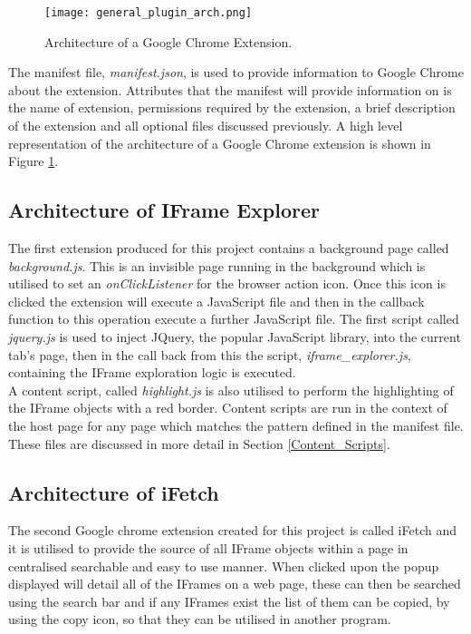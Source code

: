 \documentclass[12pt]{article}
\begin{document}
\begin{figure}[H]
    \centering
    \texttt{[image: general\_plugin\_arch.png]}
    \caption{Architecture of a Google Chrome Extension.}
    \label{fig:general_plugin_arch}
\end{figure}

The manifest file, \textit{manifest.json}, is used to provide information to Google Chrome about the extension. Attributes that the manifest will provide information on is the name of extension, permissions required by the extension, a brief description of the extension and all optional files discussed previously. A high level representation of the architecture of a Google Chrome extension is shown in Figure \ref{fig:general_plugin_arch}. 

\subsection{Architecture of IFrame Explorer}
The first extension produced for this project contains a background page called \textit{background.js}. This is an invisible page running in the background which is utilised to set an \textit{onClickListener} for the browser action icon. Once this icon is clicked the extension will execute a JavaScript file and then in the callback function to this operation execute a further JavaScript file. The first script called \textit{jquery.js} is used to inject JQuery, the popular JavaScript library, into the current tab's page, then in the call back from this the script, \textit{iframe\_explorer.js}, containing the IFrame exploration logic is executed. \\

A content script, called \textit{highlight.js} is also utilised to perform the highlighting of the IFrame objects with a red border. Content scripts are run in the context of the host page for any page which matches the pattern defined in the manifest file. These files are discussed in more detail in Section \ref{Content_Scripts}. 

\subsection{Architecture of iFetch}
The second Google chrome extension created for this project is called iFetch and it is utilised to provide the source of all IFrame objects within a page in centralised searchable and easy to use manner. When clicked upon the popup displayed will detail all of the IFrames on a web page, these can then be searched using the search bar and if any IFrames exist the list of them can be copied, by using the copy icon, so that they can be utilised in another program. \\
\end{document}
